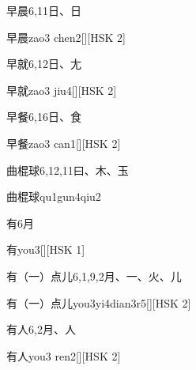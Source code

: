 \begin{entry}{早晨}{6,11}{⽇、⽇}
  \begin{phonetics}{早晨}{zao3 chen2}[][HSK 2]
  \end{phonetics}
\end{entry}

\begin{entry}{早就}{6,12}{⽇、⼪}
  \begin{phonetics}{早就}{zao3 jiu4}[][HSK 2]
  \end{phonetics}
\end{entry}

\begin{entry}{早餐}{6,16}{⽇、⾷}
  \begin{phonetics}{早餐}{zao3 can1}[][HSK 2]
  \end{phonetics}
\end{entry}

\begin{entry}{曲棍球}{6,12,11}{⽈、⽊、⽟}
  \begin{phonetics}{曲棍球}{qu1gun4qiu2}
  \end{phonetics}
\end{entry}

\begin{entry}{有}{6}{⽉}
  \begin{phonetics}{有}{you3}[][HSK 1]
  \end{phonetics}
\end{entry}

\begin{entry}{有（一）点儿}{6,1,9,2}{⽉、⼀、⽕、⼉}
  \begin{phonetics}{有（一）点儿}{you3yi4dian3r5}[][HSK 2]
  \end{phonetics}
\end{entry}

\begin{entry}{有人}{6,2}{⽉、⼈}
  \begin{phonetics}{有人}{you3 ren2}[][HSK 2]
  \end{phonetics}
\end{entry}

